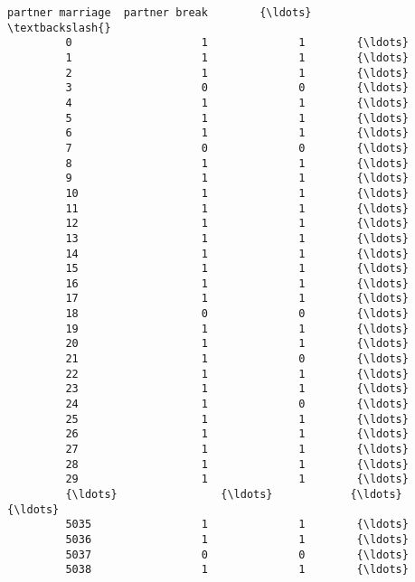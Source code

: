 \documentclass[11pt]{article}
\begin{document}
\begin{Verbatim}[commandchars=\\\{\}]
               partner marriage  partner break        {\ldots}         \textbackslash{}
         0                    1              1        {\ldots}          
         1                    1              1        {\ldots}          
         2                    1              1        {\ldots}          
         3                    0              0        {\ldots}          
         4                    1              1        {\ldots}          
         5                    1              1        {\ldots}          
         6                    1              1        {\ldots}          
         7                    0              0        {\ldots}          
         8                    1              1        {\ldots}          
         9                    1              1        {\ldots}          
         10                   1              1        {\ldots}          
         11                   1              1        {\ldots}          
         12                   1              1        {\ldots}          
         13                   1              1        {\ldots}          
         14                   1              1        {\ldots}          
         15                   1              1        {\ldots}          
         16                   1              1        {\ldots}          
         17                   1              1        {\ldots}          
         18                   0              0        {\ldots}          
         19                   1              1        {\ldots}          
         20                   1              1        {\ldots}          
         21                   1              0        {\ldots}          
         22                   1              1        {\ldots}          
         23                   1              1        {\ldots}          
         24                   1              0        {\ldots}          
         25                   1              1        {\ldots}          
         26                   1              1        {\ldots}          
         27                   1              1        {\ldots}          
         28                   1              1        {\ldots}          
         29                   1              1        {\ldots}          
         {\ldots}                {\ldots}            {\ldots}        {\ldots}          
         5035                 1              1        {\ldots}          
         5036                 1              1        {\ldots}          
         5037                 0              0        {\ldots}          
         5038                 1              1        {\ldots}          

\end{Verbatim}
\end{document}
